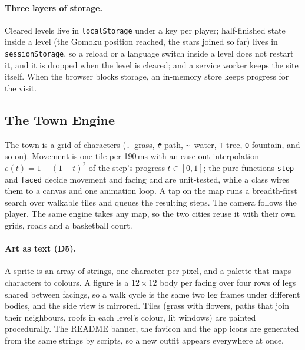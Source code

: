 \documentclass[sigconf,nonacm]{acmart}
\newcommand{\code}[1]{\textnormal{\texttt{\small #1}}}
\newcommand{\dc}[1]{\textsc{D#1}}
\begin{document}
\paragraph{Three layers of storage.} Cleared levels live in \code{localStorage} under a key per
player; half-finished state inside a level (the Gomoku position reached, the stars joined so far)
lives in \code{sessionStorage}, so a reload or a language switch inside a level does not restart it,
and it is dropped when the level is cleared; and a service worker keeps the site itself. When the
browser blocks storage, an in-memory store keeps progress for the visit.

\subsection{The Town Engine}
The town is a grid of characters (\code{.}\ grass, \code{\#} path, \code{\textasciitilde}\ water,
\code{T} tree, \code{O} fountain, and so on). Movement is one tile per 190\,ms with an ease-out
interpolation $e(t) = 1 - (1-t)^2$ of the step's progress $t \in [0,1]$; the pure functions \code{step} and \code{faced} decide movement and facing and are
unit-tested, while a class wires them to a canvas and one animation loop. A tap on the map runs a
breadth-first search over walkable tiles and queues the resulting steps. The camera follows the
player. The same engine takes any map, so the two cities reuse it with their own grids, roads and a
basketball court.

\paragraph{Art as text (\dc{5}).} A sprite is an array of strings, one character per pixel, and
a palette that maps characters to colours. A figure is a $12\times12$ body per facing over four
rows of legs shared between facings, so a walk cycle is the same two leg frames under different
bodies, and the side view is mirrored. Tiles (grass with flowers, paths that join their neighbours,
roofs in each level's colour, lit windows) are painted procedurally. The README banner, the favicon
and the app icons are generated from the same strings by scripts, so a new outfit appears
everywhere at once.
\end{document}
